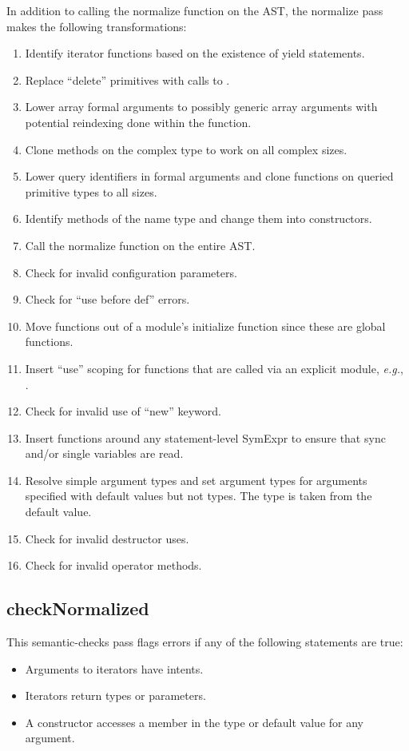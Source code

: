 \documentclass[10pt]{article}
\newcommand{\eg}{\emph{e.g.}}
\begin{document}
In addition to calling the normalize function on the AST, the
normalize pass makes the following transformations:
\begin{enumerate}
\item Identify iterator functions based on the existence of yield
  statements.
\item Replace ``delete'' primitives with calls to .
\item Lower array formal arguments to possibly generic array arguments
  with potential reindexing done within the function.
\item Clone methods on the complex type to work on all complex sizes.
\item Lower query identifiers in formal arguments and clone functions
  on queried primitive types to all sizes.
\item Identify methods of the name type and change them into
  constructors.
\item Call the normalize function on the entire AST.
\item Check for invalid configuration parameters.
\item Check for ``use before def'' errors.
\item Move functions out of a module's initialize function since these
  are global functions.
\item Insert ``use'' scoping for functions that are called via an
  explicit module, \eg, .
\item Check for invalid use of ``new'' keyword.
\item Insert functions around any statement-level SymExpr to ensure
  that sync and/or single variables are read.
\item Resolve simple argument types and set argument types for
  arguments specified with default values but not types.  The type is
  taken from the default value.
\item Check for invalid destructor uses.
\item Check for invalid operator methods.
\end{enumerate}

\subsection{checkNormalized}

This semantic-checks pass flags errors if any of the following
statements are true:
\begin{itemize}
\item Arguments to iterators have intents.
\item Iterators return types or parameters.
\item A constructor accesses a member in the type or default value for
  any argument.
\end{itemize}
\end{document}
